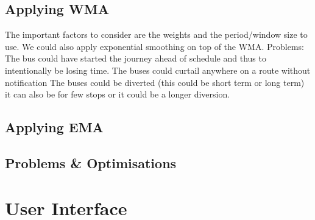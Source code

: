 	\subsection{Applying WMA}
	The important factors to consider are the weights and the period/window size to use. We could also apply exponential smoothing on top of the WMA.
	Problems:
The bus could have started the journey ahead of schedule and thus to intentionally be losing time.
The buses could curtail anywhere on a route without notification
The buses could be diverted (this could be short term or long term) it can also be for few stops or it could be a longer diversion.

	
	\subsection{Applying EMA}
	
	\subsection{Problems \& Optimisations}
	
\section{User Interface}
